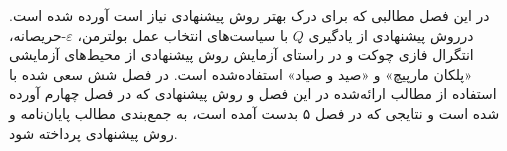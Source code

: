 در این فصل مطالبی که برای درک بهتر روش پیشنهادی نیاز است آورده شده است. درروش پیشنهادی از یادگیری $Q$ با سیاست‌های انتخاب عمل بولترمن، $\varepsilon$-حریصانه، انتگرال فازی چوکت و در راستای آزمایش روش پیشنهادی از محیط‌های آزمایشی «پلکان مارپیچ» و «صید و صیاد» استفاده‌شده است. در فصل شش سعی شده با استفاده از مطالب ارائه‌شده در این فصل و روش پیشنهادی که در فصل چهارم آورده شده است و نتایجی که در فصل ۵ بدست آمده است، به جمع‌بندی مطالب پایان‌نامه و روش پیشنهادی پرداخته شود.